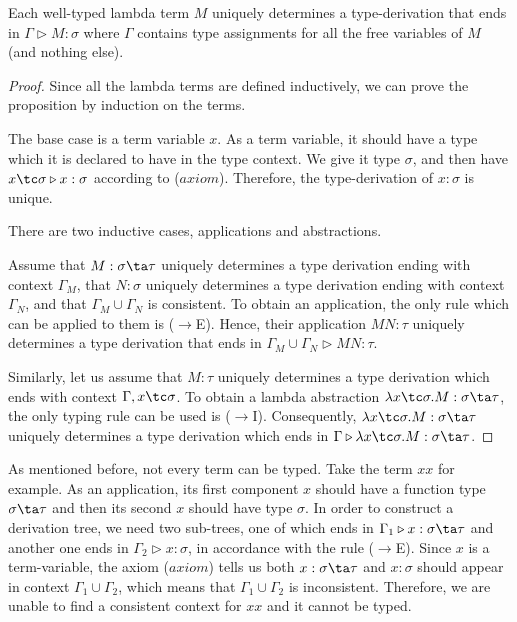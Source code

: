 \begin{proposition}
\label{proposition:unique_derivation}
Each well-typed lambda term $M$ uniquely determines a type-derivation that ends in $ \Gamma \triangleright M : \sigma $ where $ \Gamma $ contains type assignments for all the free variables of $M$ (and nothing else). \footnotemark
\end{proposition}
\begin{proof}\mbox\\

Since all the lambda terms are defined inductively, we can prove the proposition by induction on the terms.

The base case is a term variable $ x $. As a term variable, it should have a type which it is declared to have in the type context. We give it type $ \sigma $, and then have $ x \tc \sigma \triangleright x : \sigma $ according to ($axiom$). Therefore, the type-derivation of $ x : \sigma $ is unique.

There are two inductive cases, applications and abstractions.

Assume that $ M: \sigma \ta \tau $ uniquely determines a type derivation ending with context $ \Gamma_M $, that $ N: \sigma $ uniquely determines a type derivation ending with context $ \Gamma_N $, and that $ \Gamma_M \cup \Gamma_N $ is consistent. To obtain an application, the only rule which can be applied to them is ($ \to $E). Hence, their application $ MN: \tau $ uniquely determines a type derivation that ends in $ \Gamma_M \cup \Gamma_N \triangleright MN: \tau $.

Similarly, let us assume that $ M: \tau $ uniquely determines a type derivation which ends with context $ \Gamma, x \tc \sigma $. To obtain a lambda abstraction $ \lambda x \tc \sigma . M: \sigma \ta \tau $, the only typing rule can be used is ($ \to $I). Consequently, $ \lambda x \tc \sigma . M: \sigma \ta \tau $ uniquely determines a type derivation which ends in $ \Gamma \triangleright \lambda x \tc \sigma . M: \sigma \ta \tau $.

\end{proof}

As mentioned before, not every term can be typed. Take the term $ x x $ for example. As an application, its first component $ x $ should have a function type $ \sigma \ta \tau $ and then its second $ x $ should have type $ \sigma $. In order to construct a derivation tree, we need two sub-trees, one of which ends in $ \Gamma_1 \triangleright x: \sigma \ta \tau $ and another one ends in $ \Gamma_2 \triangleright x : \sigma $, in accordance with the rule ($ \to $E). Since $ x $ is a term-variable, the axiom ($ axiom $) tells us both $ x : \sigma \ta \tau $ and $ x: \sigma $ should appear in context $ \Gamma_1 \cup \Gamma_2 $, which means that $ \Gamma_1 \cup \Gamma_2 $ is inconsistent. Therefore, we are unable to find a consistent context for $ x x $ and it cannot be typed.


